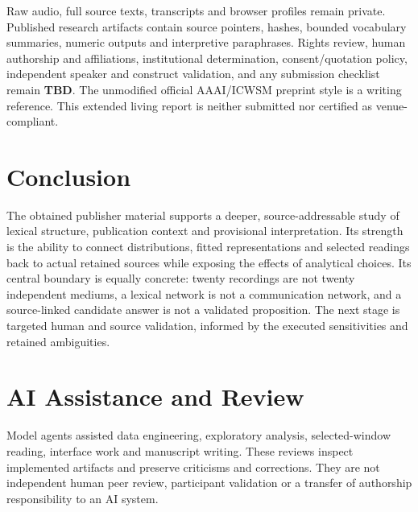 Raw audio, full source texts, transcripts and browser profiles remain private. Published research artifacts contain source pointers, hashes, bounded vocabulary summaries, numeric outputs and interpretive paraphrases. Rights review, human authorship and affiliations, institutional determination, consent/quotation policy, independent speaker and construct validation, and any submission checklist remain \textbf{TBD}. The unmodified official AAAI/ICWSM preprint style is a writing reference. This extended living report is neither submitted nor certified as venue-compliant.

\section{Conclusion}
The obtained publisher material supports a deeper, source-addressable study of lexical structure, publication context and provisional interpretation. Its strength is the ability to connect distributions, fitted representations and selected readings back to actual retained sources while exposing the effects of analytical choices. Its central boundary is equally concrete: twenty recordings are not twenty independent mediums, a lexical network is not a communication network, and a source-linked candidate answer is not a validated proposition. The next stage is targeted human and source validation, informed by the executed sensitivities and retained ambiguities.

\section*{AI Assistance and Review}
Model agents assisted data engineering, exploratory analysis, selected-window reading, interface work and manuscript writing.  These reviews inspect implemented artifacts and preserve criticisms and corrections. They are not independent human peer review, participant validation or a transfer of authorship responsibility to an AI system.
